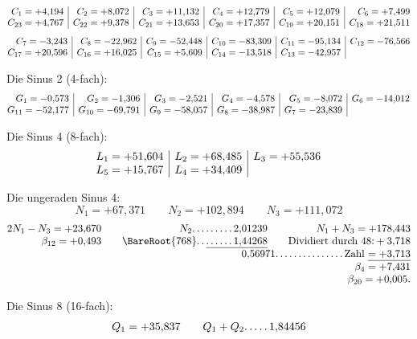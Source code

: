 \begin{landscape}
\[\begin{array}{@{}r|r|r|r|r|r@{}}
C_1=+4{,}194&C_2=+8{,}072&C_3=+11{,}132&C_4=+12{,}779&C_5=+12{,}079&C_6=+7{,}499\\
C_{23}=+4{,}767&C_{22}=+9{,}378&C_{21}=+13{,}653&C_{20}=+17{,}357&C_{19}=+20{,}151&C_{18}=+21{,}511
\end{array}
\]
\[
\begin{array}{@{}r|r|r|r|r|r@{}}
C_7=-3{,}243&C_8=-22{,}962&C_9=-52{,}448&C_{10}=-83{,}309&C_{11}=-95{,}134&C_{12}=-76{,}566\\
C_{17}=+20{,}596&C_{16}=+16{,}025&C_{15}=+5{,}609&C_{14}=-13{,}518&C_{13}=-42{,}957&
\end{array}
\]
\par\noindent\hspace*{\parindent}Die Sinus 2 (4-fach):
\[
\begin{array}{@{}r|r|r|r|r|r@{}}
G_1=-0{,}573&G_2=-1{,}306&G_3=-2{,}521&G_4=-4{,}578&G_5=-8{,}072&G_6=-14{,}012\\
G_{11}=-52{,}177&G_{10}=-69{,}791&G_9=-58{,}057&G_8=-38{,}987&G_7=-23{,}839&
\end{array}
\]
\clearpage{}
\par\noindent\hspace*{\parindent}Die Sinus 4 (8-fach):
\[
\begin{array}{@{}r|r|r@{}}
L_1=+51{,}604&L_2=+68{,}485&L_3=+55{,}536\\
L_5=+15{,}767&L_4=+34{,}409&
\end{array}
\]
\par\noindent\hspace*{\parindent}Die ungeraden Sinus 4:
\[N_1=+67{,}371\qquad N_2=+102{,}894\qquad N_3=+111{,}072\]
\[
\begin{array}{@{}r@{\qquad}r@{\qquad}r@{}}
2N_1-N_3=+23{,}670&N_2\VfourDots{8}2{,}01239&N_1+N_3=+178{,}443\\
\beta_{12}=+0{,}493&\BareRoot{768}\VfourDots{1}\underline{\VfourDots{5}1{,}44268}&\text{Dividiert durch 48:}+3{,}718\\
&\multicolumn{2}{r@{}}{0{,}56971\VfourDots{14}\text{Zahl}\ \underline{=+3{,}713}}\\
&&\beta_4=+7{,}431\\
&&\beta_{20}=+0{,}005.
\end{array}
\]
\par\noindent\hspace*{\parindent}Die Sinus 8 (16-fach):
\[
\begin{array}{@{}r@{\qquad}r@{}}
Q_1=+35{,}837&Q_1+Q_2\VfourDots{4}1{,}84456\\

\end{array}\]
\end{landscape}
